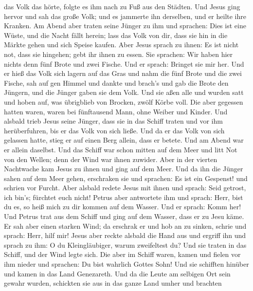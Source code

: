 das Volk das hörte, folgte es ihm nach zu Fuß aus den Städten.
 Und Jesus ging hervor und sah das große Volk; und es
jammerte ihn derselben, und er heilte ihre Kranken.  Am
Abend aber traten seine Jünger zu ihm und sprachen: Dies ist eine Wüste,
und die Nacht fällt herein; lass das Volk von dir, dass sie hin in die
Märkte gehen und sich Speise kaufen.  Aber Jesus sprach zu
ihnen: Es ist nicht not, dass sie hingehen; gebt ihr ihnen zu essen.
 Sie sprachen: Wir haben hier nichts denn fünf Brote und
zwei Fische.  Und er sprach: Bringet sie mir her.
 Und er hieß das Volk sich lagern auf das Gras und nahm die
fünf Brote und die zwei Fische, sah auf gen Himmel und dankte und
brach's und gab die Brote den Jüngern, und die Jünger gaben sie dem
Volk.  Und sie aßen alle und wurden satt und hoben auf, was
übrigblieb von Brocken, zwölf Körbe voll.  Die aber
gegessen hatten waren, waren bei fünftausend Mann, ohne Weiber und
Kinder.  Und alsbald trieb Jesus seine Jünger, dass sie in
das Schiff traten und vor ihm herüberfuhren, bis er das Volk von sich
ließe.  Und da er das Volk von sich gelassen hatte, stieg
er auf einen Berg allein, dass er betete. Und am Abend war er allein
daselbst.  Und das Schiff war schon mitten auf dem Meer und
litt Not von den Wellen; denn der Wind war ihnen zuwider. 
Aber in der vierten Nachtwache kam Jesus zu ihnen und ging auf dem Meer.
 Und da ihn die Jünger sahen auf dem Meer gehen, erschraken
sie und sprachen: Es ist ein Gespenst! und schrien vor Furcht.
 Aber alsbald redete Jesus mit ihnen und sprach: Seid
getrost, ich bin's; fürchtet euch nicht!  Petrus aber
antwortete ihm und sprach: Herr, bist du es, so heiß mich zu dir kommen
auf dem Wasser.  Und er sprach: Komm her! Und Petrus trat
aus dem Schiff und ging auf dem Wasser, dass er zu Jesu käme.
 Er sah aber einen starken Wind; da erschrak er und hob an
zu sinken, schrie und sprach: Herr, hilf mir!  Jesus aber
reckte alsbald die Hand aus und ergriff ihn und sprach zu ihm: O du
Kleingläubiger, warum zweifeltest du?  Und sie traten in
das Schiff, und der Wind legte sich.  Die aber im Schiff
waren, kamen und fielen vor ihm nieder und sprachen: Du bist wahrlich
Gottes Sohn!  Und sie schifften hinüber und kamen in das
Land Genezareth.  Und da die Leute am selbigen Ort sein
gewahr wurden, schickten sie aus in das ganze Land umher und brachten
